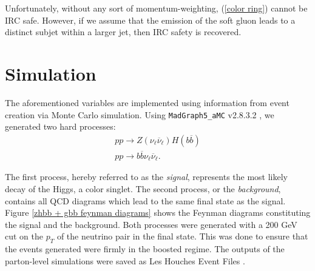 \documentclass[10pt,a4paper]{book}
\def\code#1{\texttt{#1}}
\begin{document}
Unfortunately, without any sort of momentum-weighting, (\ref{color ring}) cannot be IRC safe. However, if we assume that the emission of the soft gluon leads to a distinct subjet within a larger jet, then IRC safety is recovered.

\section{Simulation}
\label{Simulation}

The aforementioned variables are implemented using information from event creation via Monte Carlo simulation. Using \code{MadGraph5\_aMC} v2.8.3.2 \cite{Alwall:2014hca}, we generated two hard processes:
\begin{gather}
p p \rightarrow Z(\nu_\ell \overline{\nu}_\ell) H(b\overline{b}) \\
p p \rightarrow b\overline{b} \nu_\ell \overline{\nu}_\ell.
\end{gather}

The first process, hereby referred to as the \emph{signal}, represents the most likely decay of the Higgs, a color singlet. The second process, or the \emph{background}, contains all QCD diagrams which lead to the same final state as the signal. Figure \ref{zhbb + gbb feynman diagrams} shows the Feynman diagrams constituting the signal and the background. Both processes were generated with a 200 GeV cut on the $p_T$ of the neutrino pair in the final state. This was done to ensure that the events generated were firmly in the boosted regime. The outputs of the parton-level simulations were saved as Les Houches Event Files \cite{Alwall:2006yp}.
\end{document}
